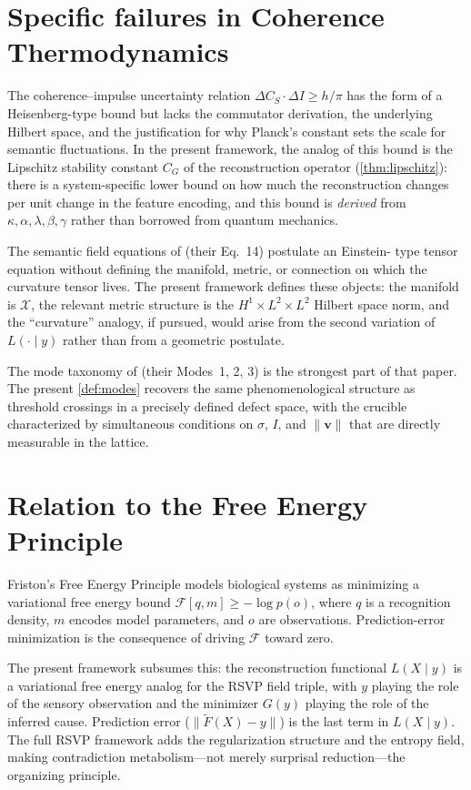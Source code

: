 \documentclass[12pt, oneside]{memoir}
\newcommand{\X}{\mathcal{X}}
\newcommand{\Ft}{\widetilde{F}}
\newcommand{\nnorm}[1]{\lVert #1 \rVert}
\newcommand{\bv}{\mathbf{v}}
\begin{document}
\section{Specific failures in Coherence Thermodynamics}

The coherence--impulse uncertainty relation $\Delta C_S \cdot \Delta I \ge h/\pi$
\cite{barton2025} has the form of a Heisenberg-type bound but lacks the commutator
derivation, the underlying Hilbert space, and the justification for why Planck's constant
sets the scale for semantic fluctuations.  In the present framework, the analog of this
bound is the Lipschitz stability constant $C_G$ of the reconstruction operator
(\cref{thm:lipschitz}): there is a system-specific lower bound on how much the
reconstruction changes per unit change in the feature encoding, and this bound is
\emph{derived} from $\kappa, \alpha, \lambda, \beta, \gamma$ rather than borrowed from
quantum mechanics.

The semantic field equations of \cite{barton2025} (their Eq.~14) postulate an Einstein-
type tensor equation without defining the manifold, metric, or connection on which the
curvature tensor lives.  The present framework defines these objects: the manifold is
$\X$, the relevant metric structure is the $H^1 \times L^2 \times L^2$ Hilbert space
norm, and the ``curvature'' analogy, if pursued, would arise from the second variation
of $L(\cdot \mid y)$ rather than from a geometric postulate.

The mode taxonomy of \cite{barton2025} (their Modes~1, 2, 3) is the strongest part of
that paper.  The present \cref{def:modes} recovers the same phenomenological structure
as threshold crossings in a precisely defined defect space, with the crucible
characterized by simultaneous conditions on $\sigma$, $I$, and $\nnorm{\bv}$ that are
directly measurable in the lattice.

\section{Relation to the Free Energy Principle}

Friston's Free Energy Principle \cite{friston2010} models biological systems as
minimizing a variational free energy bound $\mathcal{F}[q, m] \ge -\log p(o)$, where
$q$ is a recognition density, $m$ encodes model parameters, and $o$ are observations.
Prediction-error minimization is the consequence of driving $\mathcal{F}$ toward zero.

The present framework subsumes this: the reconstruction functional $L(X \mid y)$
is a variational free energy analog for the RSVP field triple, with $y$ playing the role
of the sensory observation and the minimizer $G(y)$ playing the role of the inferred
cause.  Prediction error ($\nnorm{\Ft(X) - y}$) is the last term in $L(X \mid y)$.
The full RSVP framework adds the regularization structure and the entropy field, making
contradiction metabolism---not merely surprisal reduction---the organizing principle.
\end{document}
